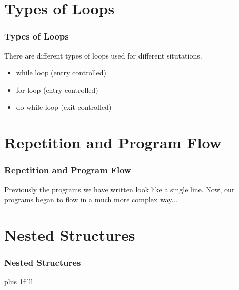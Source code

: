 \documentclass[fleqn]{beamer} %
\newcommand{\sectiontitleII}{Types of Loops }
\newcommand{\sectiontitleIII}{Repetition and Program Flow}
\newcommand{\sectiontitleIV}{Nested Structures}
\newcommand{\btVFill}{\vskip0pt plus 1filll}
\begin{document}
\section{\sectiontitleII}

	\begin{frame}[label=sectionII,containsverbatim] \small
		\frametitle{\sectiontitleII}
	
	There are different types of loops used for different situtations. 
		
	\begin{itemize}
		\item while loop (entry controlled)
		\item for loop (entry controlled)
		\item do while loop (exit controlled)	
	\end{itemize}


		
	\end{frame}


\section{\sectiontitleIII}

	\begin{frame}[label=sectionIII,containsverbatim] \small
	\frametitle{\sectiontitleIII}
	
Previously the programs we have written look like a single line. Now, our programs began to flow in a much more complex way...  \vspace{5mm}\\
			
			\vspace{40mm}


	
	\end{frame}



\section{\sectiontitleIV}	
	\begin{frame}[label=sectionIV,containsverbatim] \small
		\frametitle{\sectiontitleIV}    
	
		

		 

		\btVFill
	\end{frame}
\end{document}

